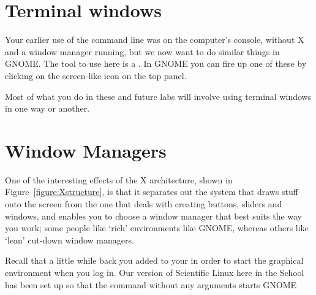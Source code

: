 \section{Terminal windows}
Your earlier use of the command line was on the computer's console, without X and a window manager running, but we now want to do similar things in GNOME. The tool to use here is a . In GNOME you can fire up one of  these by clicking on the screen-like icon on the top panel.


Most of what you do in these and future labs will involve using terminal windows in one way or another.



\section{Window Managers} 
One of the interesting effects of the X architecture, shown in Figure~\ref{figure:Xstructure}, is that it separates out the system that draws stuff onto the screen from the one that deals with creating buttons, sliders and windows, and enables you to choose a window manager that best suits the way you work; some people like `rich' environments like GNOME, whereas others like `lean' cut-down window managers. 

Recall that a little while back you added  to your  in order to start the graphical environment when you log in. Our version of Scientific Linux here in the School has been set up so that the  command without any arguments starts GNOME 

